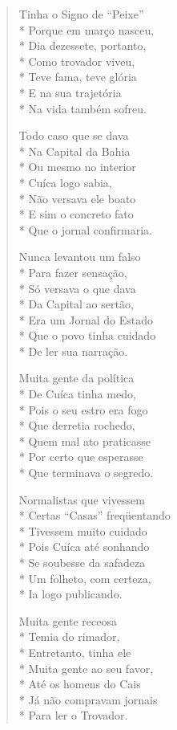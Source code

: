 \begin{verse}
Tinha o Signo de ``Peixe''\\*
Porque em março nasceu,\\*
Dia dezessete, portanto,\\*
Como trovador viveu,\\*
Teve fama, teve glória\\*
E na sua trajetória\\*
Na vida também sofreu.

Todo caso que se dava\\*
Na Capital da Bahia\\*
Ou mesmo no interior\\*
Cuíca logo sabia,\\*
Não versava ele boato\\*
E sim o concreto fato\\*
Que o jornal confirmaria.

Nunca levantou um falso\\*
Para fazer sensação,\\*
Só versava o que dava\\*
Da Capital ao sertão,\\*
Era um Jornal do Estado\\*
Que o povo tinha cuidado\\*
De ler sua narração.

Muita gente da política\\*
De Cuíca tinha medo,\\*
Pois o seu estro era fogo\\*
Que derretia rochedo,\\*
Quem mal ato praticasse\\*
Por certo que esperasse\\*
Que terminava o segredo.

Normalistas que vivessem\\*
Certas ``Casas'' freqüentando\\*
Tivessem muito cuidado\\*
Pois Cuíca até sonhando\\*
Se soubesse da safadeza\\*
Um folheto, com certeza,\\*
Ia logo publicando.

Muita gente receosa\\*
Temia do rimador,\\*
Entretanto, tinha ele\\*
Muita gente ao seu favor,\\*
Até os homens do Cais\\*
Já não compravam jornais\\*
Para ler o Trovador.


\end{verse}
